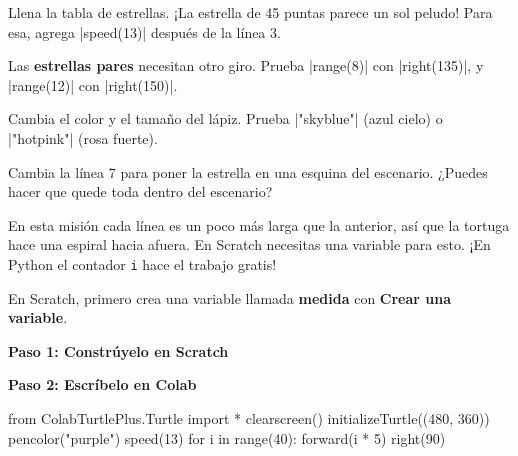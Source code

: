 \begin{challenge}
\tick Llena la tabla de estrellas. ¡La estrella de 45 puntas parece un sol peludo! Para esa, agrega \py|speed(13)| después de la línea 3.\par
\tick Las \textbf{estrellas pares} necesitan otro giro. Prueba \py|range(8)| con \py|right(135)|, y \py|range(12)| con \py|right(150)|.\par
\tick Cambia el color y el tamaño del lápiz. Prueba \py|"skyblue"| (azul cielo) o \py|"hotpink"| (rosa fuerte).\par
\tick Cambia la línea 7 para poner la estrella en una esquina del escenario. ¿Puedes hacer que quede toda dentro del escenario?
\end{challenge}


En esta misión cada línea es un poco más larga que la anterior, así que la tortuga hace una espiral hacia afuera. En Scratch necesitas una variable para esto. ¡En Python el contador \texttt{i} hace el trabajo gratis!

En Scratch, primero crea una variable llamada \textbf{medida} con \textbf{Crear una variable}.

\begin{tcbraster}[raster columns=2, raster column skip=12pt, raster valign=top, raster force size=false,
  raster column 1/.style={add to width=-2.0cm}, raster column 2/.style={add to width=2.0cm}]
\begin{tcolorbox}[blankest]{\normalsize\bfseries\color{ink}Paso 1: Constrúyelo en Scratch}\end{tcolorbox}
\begin{tcolorbox}[blankest]{\normalsize\bfseries\color{ink}Paso 2: Escríbelo en Colab}\end{tcolorbox}
\begin{tcolorbox}[blankest]
\begin{scratch}[scale=0.75]
\end{scratch}
\end{tcolorbox}
\begin{typethis}
from ColabTurtlePlus.Turtle import *
clearscreen()
initializeTurtle((480, 360))
pencolor("purple")
speed(13)
for i in range(40):
    forward(i * 5)
    right(90)
\end{typethis}
\end{tcbraster}


